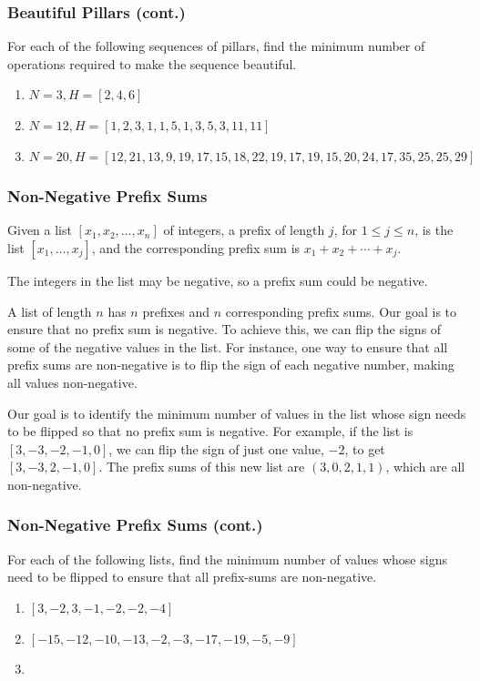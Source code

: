 \documentclass{beamer}
\begin{document}
\begin{frame}
\frametitle{Beautiful Pillars (cont.)}

For each of the following sequences of pillars, find the minimum number of operations required to make the sequence beautiful.

\begin{enumerate}
\item[(a)] $N = 3, H = [2, 4, 6]$
\item[(b)] $N = 12, H = [1, 2, 3, 1, 1, 5, 1, 3, 5, 3, 11, 11]$
\item[(c)] $N = 20, H = [12, 21, 13, 9, 19, 17, 15, 18, 22, 19, 17, 19, 15, 20, 24, 17, 35, 25, 25, 29]$
\end{enumerate}

\end{frame}

\begin{frame}
\end{frame}

\begin{frame}[fragile]
\frametitle{Non-Negative Prefix Sums}

Given a list $[x_1, x_2, \ldots, x_n]$ of integers, a prefix of length $j$, for $1 \leq j \leq n$, is the list $[x_1, \ldots, x_j]$, and the corresponding prefix sum is $x_1 + x_2 + \cdots + x_j$.

The integers in the list may be negative, so a prefix sum could be negative.

A list of length $n$ has $n$ prefixes and $n$ corresponding prefix sums. Our goal is to ensure that no prefix sum is negative. To achieve this, we can flip the signs of some of the negative values in the list. For instance, one way to ensure that all prefix sums are non-negative is to flip the sign of each negative number, making all values non-negative.

Our goal is to identify the minimum number of values in the list whose sign needs to be flipped so that no prefix sum is negative. For example, if the list is $[3, -3, -2, -1, 0]$, we can flip the sign of just one value, $-2$, to get $[3, -3, 2, -1, 0]$. The prefix sums of this new list are $(3, 0, 2, 1, 1)$, which are all non-negative.
\end{frame}

\begin{frame}
\frametitle{Non-Negative Prefix Sums (cont.)}
For each of the following lists, find the minimum number of values whose signs need to be flipped to ensure that all prefix-sums are non-negative.

\begin{enumerate}
\item[(a)] $[3, -2, 3, -1, -2, -2, -4]$
\item[(b)] $[-15, -12, -10, -13, -2, -3, -17, -19, -5, -9]$
\item[(c)] [-12, -2, -16, -19, -9, -3, -7, -11, -17, -3, -15, -10, -10, -15, -8]
\end{enumerate}
\end{frame}
\end{document}
